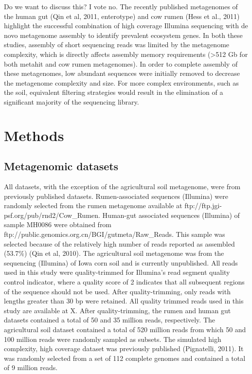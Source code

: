 \documentclass[11pt]{article} %
\begin{document}
Do we want to discuss this?  I vote no.
The recently published metagenomes of the human gut (Qin et al, 2011, enterotype) and cow rumen (Hess et al., 2011) highlight the successful combination of high coverage Illumina sequencing with de novo metagenome assembly to identify prevalent ecosystem genes.  In both these studies, assembly of short sequencing reads was limited by the metagenome complexity, which is directly affects assembly memory requirements (>512 Gb for both metahit and cow rumen metagenomes).  In order to complete assembly of these metagenomes, low abundant sequences were initially removed to decrease the metagenome complexity and size.  For more complex environments, such as the soil, equivalent filtering strategies would result in the elimination of a significant majority of the sequencing library.   

\section{Methods}

\subsection{Metagenomic datasets}

All datasets, with the exception of the agricultural soil metagenome, were from
previously published datasets. Rumen-associated sequences (Illumina)
were randomly selected from the rumen metagenome available at ftp://ftp.jgi-psf.org/pub/rnd2/Cow\_Rumen. Human-gut associated sequences (Illumina) of sample MH0086 were obtained from ftp://public.genomics.org.cn/BGI/gutmeta/Raw\_Reads. This sample
was selected because of the relatively high number of reads reported
as assembled (53.7\%) (Qin et al, 2010). The agricultural
soil metagenome was from the sequencing (Illumina) of Iowa corn soil and is currently unpublished. All reads used in this study were quality-trimmed for Illumina's read segment quality control indicator, where a quality score of 2 indicates that all subsequent
regions of the sequence should not be used. After quality-trimming,
only reads with lengths greater than 30 bp were retained. All quality
trimmed reads used in this study are available at X. After quality-trimming,
the rumen and human gut datasets contained a total of 50 and
35 million reads, respectively. The agricultural soil dataset contained
a total of 520 million reads from which 50 and 100 million reads were
randomly sampled as subsets. The simulated high complexity, high coverage
dataset was previously published (Pignatelli, 2011). It was randomly
selected from a set of 112 complete genomes and contained a total
of 9 million reads.
\end{document}

